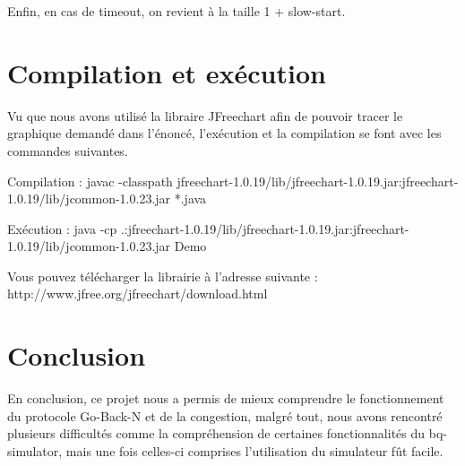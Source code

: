 \documentclass[11pt,a4paper]{article}
\begin{document}
	Enfin, en cas de timeout, on revient à la taille 1 + slow-start.	
	
\newpage

\section{Compilation et exécution}
	
	Vu que nous avons utilisé la libraire JFreechart afin de pouvoir tracer le graphique demandé dans l'énoncé, l'exécution et la compilation se font avec les commandes suivantes.
	
	Compilation : javac -classpath jfreechart-1.0.19/lib/jfreechart-1.0.19.jar:jfreechart-1.0.19/lib/jcommon-1.0.23.jar *.java
	
	Exécution :  java -cp .:jfreechart-1.0.19/lib/jfreechart-1.0.19.jar:jfreechart-1.0.19/lib/jcommon-1.0.23.jar Demo
	
	Vous pouvez télécharger la librairie à l'adresse suivante : \\ http://www.jfree.org/jfreechart/download.html
	
\section{Conclusion}

	En conclusion, ce projet nous a permis de mieux comprendre le fonctionnement du protocole Go-Back-N et de la congestion, malgré tout, nous avons rencontré plusieurs difficultés comme la compréhension de certaines fonctionnalités du bq-simulator, mais une fois celles-ci comprises l'utilisation du simulateur fût facile. 
\end{document}
